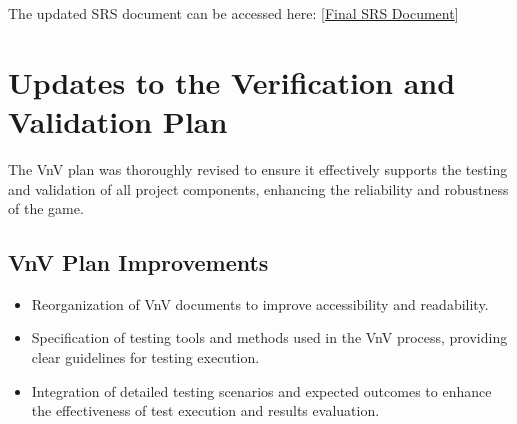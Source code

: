 \documentclass[12pt]{article}
\begin{document}
The updated SRS document can be accessed here:
[\href{https://github.com/XessX/Angry_Bird_Alike/blob/main/docs/SRS/SRS.pdf}{Final SRS Document}]

\section{Updates to the Verification and Validation Plan}
The VnV plan was thoroughly revised to ensure it effectively supports the testing and validation of all project components, enhancing the reliability and robustness of the game.

\subsection{VnV Plan Improvements}
\begin{itemize}
    \item Reorganization of VnV documents to improve accessibility and readability.
    \item Specification of testing tools and methods used in the VnV process, providing clear guidelines for testing execution.
    \item Integration of detailed testing scenarios and expected outcomes to enhance the effectiveness of test execution and results evaluation.
\end{itemize}
\end{document}
